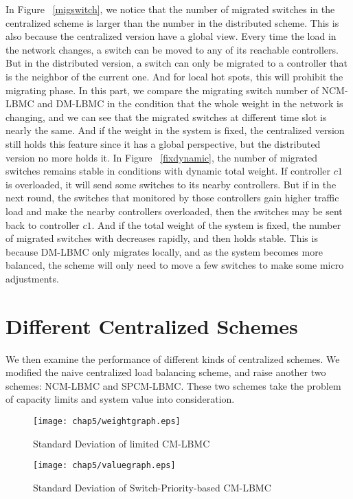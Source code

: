 In Figure ~\ref{migswitch}, we notice that the number of migrated switches in the centralized scheme is larger than the number in the distributed scheme. This is also because the centralized version have a global view. Every time the load in the network changes, a switch can be moved to any of its reachable controllers. But in the distributed version, a switch can only be migrated to a controller that is the neighbor of the current one. And for local hot spots, this will prohibit the migrating phase. In this part, we compare the migrating switch number of NCM-LBMC and DM-LBMC in the condition that the whole weight in the network is changing, and we can see that the migrated switches at different time slot is nearly the same. And if the weight in the system is fixed, the centralized version still holds this feature since it has a global perspective, but the distributed version no more holds it. In Figure ~\ref{fixdynamic}, the number of migrated switches remains stable in conditions with dynamic total weight. If controller $c1$ is overloaded, it will send some switches to its nearby controllers. But if in the next round, the switches that monitored by those controllers gain higher traffic load and make the nearby controllers overloaded, then the switches may be sent back to controller $c1$. And if the total weight of the system is fixed, the number of migrated switches with decreases rapidly, and then holds stable. This is because DM-LBMC only migrates locally, and as the system becomes more balanced, the scheme will only need to move a few switches to make some micro adjustments. 

\vspace{-5pt}
\section{Different Centralized Schemes}

We then examine the performance of different kinds of centralized schemes. We modified the naive centralized load balancing scheme, and raise another two schemes: NCM-LBMC and SPCM-LBMC. These two schemes take the problem of capacity limits and system value into consideration.

\begin{figure}[!htbp]
\begin{minipage}[t]{0.45\textwidth}
    \centering
    \texttt{[image: chap5/weightgraph.eps]}
    \caption{Standard Deviation of limited CM-LBMC}\label{weightgraph}
  \end{minipage}\hspace{0.3cm}
  \begin{minipage}[t]{0.45\textwidth}
    \centering
    \texttt{[image: chap5/valuegraph.eps]}
    \caption{Standard Deviation of Switch-Priority-based CM-LBMC}\label{valuegraph}
  \end{minipage}\hspace{0.3cm}
\end{figure}

